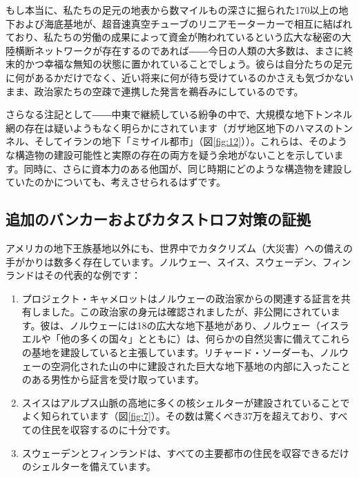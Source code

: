 \documentclass[10pt,twocolumn,letterpaper]{article}
\begin{document}
もし本当に、私たちの足元の地表から数マイルもの深さに掘られた170以上の地下および海底基地が、超音速真空チューブのリニアモーターカーで相互に結ばれており、私たちの労働の成果によって資金が賄われているという広大な秘密の大陸横断ネットワークが存在するのであれば――今日の人類の大多数は、まさに終末的かつ幸福な無知の状態に置かれていることでしょう。彼らは自分たちの足元に何があるかだけでなく、近い将来に何が待ち受けているのかさえも気づかないまま、政治家たちの空疎で連携した発言を鵜呑みにしているのです。

さらなる注記として――中東で継続している紛争の中で、大規模な地下トンネル網の存在は疑いようもなく明らかにされています（ガザ地区地下のハマスのトンネル\cite{38}、そしてイランの地下「ミサイル都市」（図\ref{fig:12}）\cite{39,40}）。これらは、そのような構造物の建設可能性と実際の存在の両方を疑う余地がないことを示しています。同時に、さらに資本力のある他国が、同じ時期にどのような構造物を建設していたのかについても、考えさせられるはずです。

\subsection{追加のバンカーおよびカタストロフ対策の証拠}

アメリカの地下王族基地以外にも、世界中でカタクリズム（大災害）への備えの手がかりは数多く存在しています。ノルウェー、スイス、スウェーデン、フィンランドはその代表的な例です：

\begin{flushleft}
\begin{enumerate}
    \item プロジェクト・キャメロットはノルウェーの政治家からの関連する証言を共有しました\cite{25,26}。この政治家の身元は確認されましたが、非公開にされています。彼は、ノルウェーには18の広大な地下基地があり、ノルウェー（イスラエルや「他の多くの国々」とともに）は、何らかの自然災害に備えてこれらの基地を建設していると主張しています。リチャード・ソーダーも、ノルウェーの空洞化された山の中に建設された巨大な地下基地の内部に入ったことのある男性から証言を受け取っています\cite{22}。
    \item スイスはアルプス山脈の高地に多くの核シェルターが建設されていることでよく知られています（図\ref{fig:7}）。その数は驚くべき37万を超えており、すべての住民を収容するのに十分です\cite{27}。
    \item スウェーデンとフィンランドは、すべての主要都市の住民を収容できるだけのシェルターを備えています\cite{27}。
\end{enumerate}
\end{flushleft}
\end{document}
